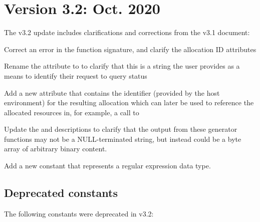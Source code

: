 \section{Version 3.2: Oct. 2020}

The v3.2 update includes clarifications and corrections from the v3.1 document:

\begin{compactitemize}
    \item Correct an error in the  function signature, and clarify the allocation ID attributes
    \item Rename the  attribute to  to clarify that this is a string the user provides as a means to identify their request to query status
    \item Add a new  attribute that contains the identifier (provided by the host environment) for the resulting allocation which can later be used to reference the allocated resources in, for example, a call to 
    \item Update the  and  descriptions to clarify that the output from these generator functions may not be a NULL-terminated string, but instead could be a byte array of arbitrary binary content.
    \item Add a new  constant that represents a regular expression data type.
\end{compactitemize}


\subsection{Deprecated constants}

The following constants were deprecated in v3.2:

